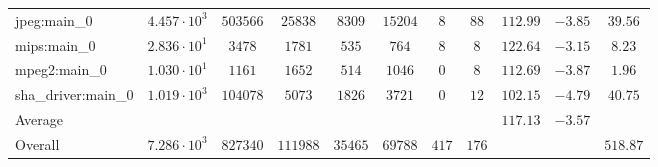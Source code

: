 \begin{tabular}{|l|c|c|c|c|c|c|c|c|c|c|}
jpeg:main\_0            & $ 4.457 \cdot 10^{3} $ & $ 503566 $ & $ 25838  $ & $ 8309  $ & $ 15204 $ & $ 8   $ & $ 88  $ & $ 112.99      $ & $ -3.85   $ & $ 39.56   $ \\
mips:main\_0            & $ 2.836 \cdot 10^{1} $ & $ 3478   $ & $ 1781   $ & $ 535   $ & $ 764   $ & $ 8   $ & $ 8   $ & $ 122.64      $ & $ -3.15   $ & $ 8.23    $ \\
mpeg2:main\_0           & $ 1.030 \cdot 10^{1} $ & $ 1161   $ & $ 1652   $ & $ 514   $ & $ 1046  $ & $ 0   $ & $ 8   $ & $ 112.69      $ & $ -3.87   $ & $ 1.96    $ \\
sha\_driver:main\_0     & $ 1.019 \cdot 10^{3} $ & $ 104078 $ & $ 5073   $ & $ 1826  $ & $ 3721  $ & $ 0   $ & $ 12  $ & $ 102.15      $ & $ -4.79   $ & $ 40.75   $ \\
\hline
Average                 & $                    $ & $        $ & $        $ & $       $ & $       $ & $     $ & $     $ & $ 117.13      $ & $ -3.57   $ & $         $ \\
\hline
Overall                 & $ 7.286 \cdot 10^{3} $ & $ 827340 $ & $ 111988 $ & $ 35465 $ & $ 69788 $ & $ 417 $ & $ 176 $ & $             $ & $         $ & $ 518.87  $ \\
\hline
\end{tabular}
